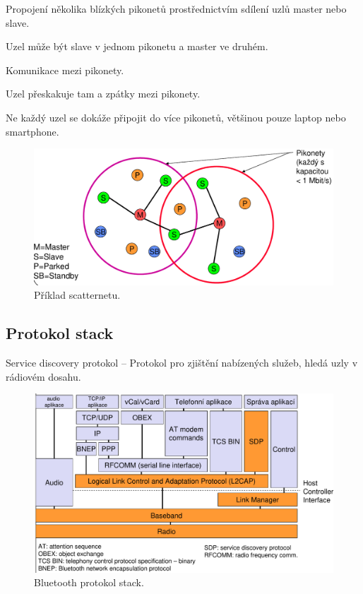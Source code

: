 \begin{compactitem}
    \item Propojení několika blízkých pikonetů prostřednictvím sdílení uzlů master nebo slave. \begin{compactitem}
        \item Uzel může být slave v jednom pikonetu a master ve druhém.
    \end{compactitem}

    \item Komunikace mezi pikonety. \begin{compactitem}
        \item Uzel přeskakuje tam a zpátky mezi pikonety.
    \end{compactitem}

    \item Ne každý uzel se dokáže připojit do více pikonetů, většinou pouze laptop nebo smartphone.
\end{compactitem}

\begin{figure}[H]
    \centering
    \includegraphics[width=0.9\linewidth]{scatternet.pdf}
    \caption{Příklad scatternetu.}
\end{figure}

\subsection{Protokol stack}

\begin{compactitem}
    \item Service discovery protokol -- Protokol pro zjištění nabízených služeb, hledá uzly v rádiovém dosahu.
\end{compactitem}

\begin{figure}[H]
    \centering
    \includegraphics[width=1\linewidth]{bluetooth_protocol_stack.pdf}
    \caption{Bluetooth protokol stack.}
\end{figure}
